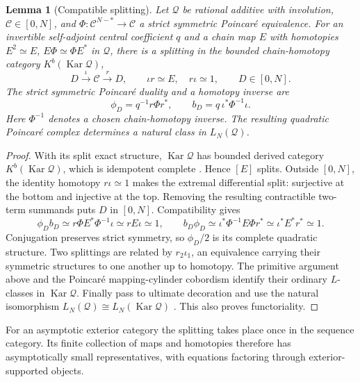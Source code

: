 \documentclass[11pt]{amsart}
\numberwithin{equation}{section}
\newtheorem{lemma}[lemma]{Lemma}
\theoremstyle{definition}
\theoremstyle{remark}
\DeclareMathOperator{\Kar}{Kar}
\begin{document}
\begin{lemma}[Compatible splitting]\label{alg:corner}
Let $\mathcal Q$ be rational additive with involution,
$\mathcal C\in[0,N]$, and
$\Phi:\mathcal C^{N-*}\to\mathcal C$ a strict symmetric Poincar\'e equivalence.
For an invertible self-adjoint central coefficient $q$ and a chain map
$E$ with homotopies $E^2\simeq E$, $E\Phi\simeq\Phi E^*$ in $\mathcal Q$,
there is a splitting in the bounded chain-homotopy category
$K^b(\Kar\mathcal Q)$,
\begin{equation}\label{alg:split}
 D\xrightarrow{\iota}\mathcal C\xrightarrow rD,\qquad
 \iota r\simeq E,\quad r\iota\simeq1,\qquad D\in[0,N].
\end{equation}
The strict symmetric Poincar\'e duality and a homotopy inverse are
\begin{equation}\label{alg:cornerform}
 \phi_D=q^{-1}r\Phi r^*,\qquad b_D=q\,\iota^*\Phi^{-1}\iota.
\end{equation}
Here $\Phi^{-1}$ denotes a chosen chain-homotopy inverse.
The resulting quadratic Poincar\'e complex determines a natural class
in $L_N(\mathcal Q)$.
\end{lemma}
\begin{proof}
With its split exact structure, $\Kar\mathcal Q$ has bounded derived
category $K^b(\Kar\mathcal Q)$, which is idempotent complete
\cite[Theorem 2.8]{BS01}. Hence $[E]$ splits. Outside $[0,N]$, the
identity homotopy $r\iota\simeq1$ makes the extremal differential split:
surjective at the bottom and injective at the top. Removing the resulting
contractible two-term summands puts $D$ in $[0,N]$.
Compatibility gives
\[
 \phi_Db_D\simeq r\Phi E^*\Phi^{-1}\iota\simeq rE\iota\simeq1,
 \qquad b_D\phi_D\simeq\iota^*\Phi^{-1}E\Phi r^*
                 \simeq\iota^*E^*r^*\simeq1.
\]
Conjugation preserves strict symmetry, so $\phi_D/2$ is its complete
quadratic structure. Two splittings are related by $r_2\iota_1$, an
equivalence carrying their symmetric structures to one another up to
homotopy. The primitive argument above and the Poincar\'e
mapping-cylinder cobordism \cite[Definition 3.10]{Ran89} identify their
ordinary $L$-classes in $\Kar\mathcal Q$. Finally pass to ultimate
decoration and use the natural isomorphism
$L_N(\mathcal Q)\cong L_N(\Kar\mathcal Q)$
\cite[Definition 17.7]{Ran92}. This also proves functoriality.
\end{proof}

For an asymptotic exterior category the splitting takes place once in
the sequence category. Its finite collection of maps and homotopies
therefore has asymptotically small representatives, with equations
factoring through exterior-supported objects.
\end{document}
